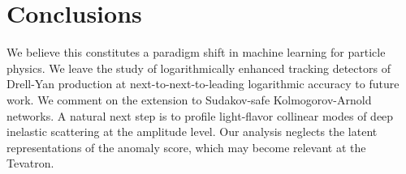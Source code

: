 \section{Conclusions}\label{sec:conclusions}

We believe this constitutes a paradigm shift in machine learning for
particle physics. We leave the study of logarithmically enhanced
tracking detectors of Drell-Yan production at next-to-next-to-leading
logarithmic accuracy to future work. We comment on the extension to
Sudakov-safe Kolmogorov-Arnold networks. A natural next step is to
profile light-flavor collinear modes of deep inelastic scattering at the
amplitude level. Our analysis neglects the latent representations of the
anomaly score, which may become relevant at the Tevatron.

